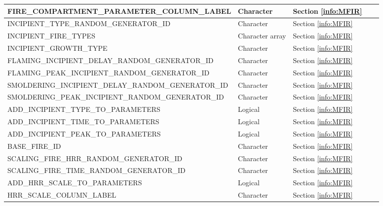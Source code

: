 \begin{landscape}
\begin{longtable}{|l|l|l|l|l|}
{\ct FIRE\_COMPARTMENT\_PARAMETER\_COLUMN\_LABEL}           & Character         & Section \ref{info:MFIR}   &      &     \\ \hline \hline
{\ct INCIPIENT\_TYPE\_RANDOM\_GENERATOR\_ID}                & Character         & Section \ref{info:MFIR}   &      &     \\ \hline
{\ct INCIPIENT\_FIRE\_TYPES}                                & Character array   & Section \ref{info:MFIR}   &      &     \\ \hline
{\ct INCIPIENT\_GROWTH\_TYPE}                               & Character         & Section \ref{info:MFIR}   &      &     \\ \hline
{\ct FLAMING\_INCIPIENT\_DELAY\_RANDOM\_GENERATOR\_ID}      & Character         & Section \ref{info:MFIR}   &      &     \\ \hline
{\ct FLAMING\_PEAK\_INCIPIENT\_RANDOM\_GENERATOR\_ID}       & Character         & Section \ref{info:MFIR}   &      &     \\ \hline
{\ct SMOLDERING\_INCIPIENT\_DELAY\_RANDOM\_GENERATOR\_ID}   & Character         & Section \ref{info:MFIR}   &      &     \\ \hline
{\ct SMOLDERING\_PEAK\_INCIPIENT\_RANDOM\_GENERATOR\_ID}    & Character         & Section \ref{info:MFIR}   &      &     \\ \hline
{\ct ADD\_INCIPIENT\_TYPE\_TO\_PARAMETERS}                  & Logical           & Section \ref{info:MFIR}   &      &     \\ \hline
{\ct ADD\_INCIPIENT\_TIME\_TO\_PARAMETERS}                  & Logical           & Section \ref{info:MFIR}   &      &     \\ \hline
{\ct ADD\_INCIPIENT\_PEAK\_TO\_PARAMETERS}                  & Logical           & Section \ref{info:MFIR}   &      &     \\ \hline \hline
{\ct BASE\_FIRE\_ID}                                        & Character         & Section \ref{info:MFIR}   &      &     \\ \hline
{\ct SCALING\_FIRE\_HRR\_RANDOM\_GENERATOR\_ID}             & Character         & Section \ref{info:MFIR}   &      &     \\ \hline
{\ct SCALING\_FIRE\_TIME\_RANDOM\_GENERATOR\_ID}            & Character         & Section \ref{info:MFIR}   &      &     \\ \hline
{\ct ADD\_HRR\_SCALE\_TO\_PARAMETERS}                       & Logical           & Section \ref{info:MFIR}   &      &     \\ \hline
{\ct HRR\_SCALE\_COLUMN\_LABEL}                             & Character         & Section \ref{info:MFIR}   &      &     \\ \hline

\end{longtable}
\end{landscape}
